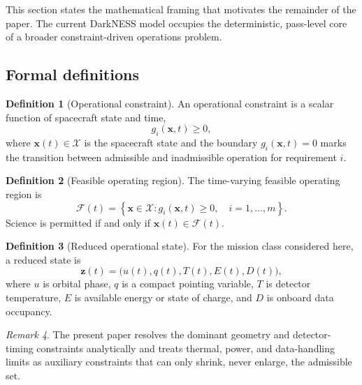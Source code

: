 \documentclass[preprint,12pt]{elsarticle}
\theoremstyle{definition}
\newtheorem{definition}{Definition}[section]
\theoremstyle{remark}
\newtheorem{remark}[definition]{Remark}
\begin{document}
This section states the mathematical framing that motivates the remainder of the paper.
The current DarkNESS model occupies the deterministic, pass-level core of a broader constraint-driven operations problem.

\subsection{Formal definitions}

\begin{definition}[Operational constraint]
An operational constraint is a scalar function of spacecraft state and time,
\begin{equation}
g_i(\mathbf{x},t)\ge 0,
\label{eq:constraint_general}
\end{equation}
where $\mathbf{x}(t)\in\mathcal{X}$ is the spacecraft state and the boundary $g_i(\mathbf{x},t)=0$ marks the transition between admissible and inadmissible operation for requirement $i$.
\end{definition}

\begin{definition}[Feasible operating region]
The time-varying feasible operating region is
\begin{equation}
\mathcal{F}(t)
=
\left\{
\mathbf{x}\in\mathcal{X} :
g_i(\mathbf{x},t)\ge 0,\quad i=1,\ldots,m
\right\}.
\label{eq:feasible_region}
\end{equation}
Science is permitted if and only if $\mathbf{x}(t)\in\mathcal{F}(t)$.
\end{definition}

\begin{definition}[Reduced operational state]
For the mission class considered here, a reduced state is
\begin{equation}
\mathbf{z}(t)=\big(u(t),q(t),T(t),E(t),D(t)\big),
\label{eq:reduced_state}
\end{equation}
where $u$ is orbital phase, $q$ is a compact pointing variable, $T$ is detector temperature, $E$ is available energy or state of charge, and $D$ is onboard data occupancy.
\end{definition}

\begin{remark}
The present paper resolves the dominant geometry and detector-timing constraints analytically and treats thermal, power, and data-handling limits as auxiliary constraints that can only shrink, never enlarge, the admissible set.
\end{remark}
\end{document}
